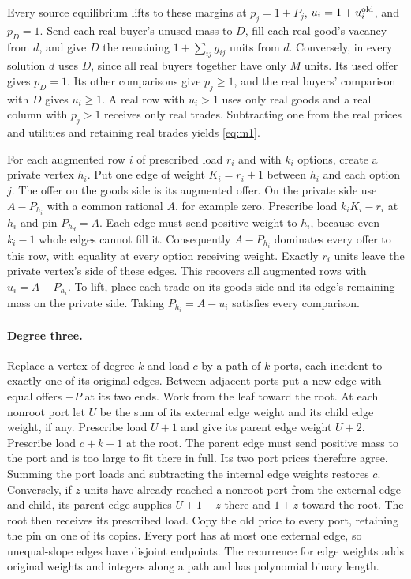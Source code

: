 \documentclass[11pt,oneside,openany,notitlepage]{report}
\begin{document}
Every source equilibrium lifts to these margins at \(p_j=1+P_j\),
\(u_i=1+u_i^{\rm old}\), and \(p_D=1\). Send each real buyer's unused
mass to \(D\), fill each real good's vacancy from \(d\), and give \(D\)
the remaining \(1+\sum_{ij}g_{ij}\) units from \(d\). Conversely, in
every solution \(d\) uses \(D\), since all real buyers together have
only \(M\) units. Its used offer gives \(p_D=1\). Its other comparisons
give \(p_j\ge1\), and the real buyers' comparison with \(D\) gives
\(u_i\ge1\). A real row with \(u_i>1\) uses only real goods and a real
column with \(p_j>1\) receives only real trades. Subtracting one from the
real prices and utilities and retaining real trades yields \eqref{eq:m1}.

For each augmented row \(i\) of prescribed load \(r_i\) and with \(k_i\)
options, create a private vertex \(h_i\). Put one edge of weight
\(K_i=r_i+1\) between \(h_i\) and each option \(j\). The offer on the
goods side is its augmented offer. On the private side use \(A-P_{h_i}\)
with a common rational \(A\), for example zero. Prescribe load
\(k_iK_i-r_i\) at \(h_i\) and pin \(P_{h_d}=A\).
Each edge must send positive weight to \(h_i\), because even \(k_i-1\)
whole edges cannot fill it. Consequently \(A-P_{h_i}\) dominates every
offer to this row, with equality at every option receiving weight.
Exactly \(r_i\) units leave the private vertex's side of these edges.
This recovers all augmented rows with \(u_i=A-P_{h_i}\). To lift, place
each trade on its goods side and its edge's remaining mass on the private
side. Taking \(P_{h_i}=A-u_i\) satisfies every comparison.

\paragraph{Degree three.}
Replace a vertex of degree \(k\) and load \(c\) by a path of \(k\) ports,
each incident to exactly one of its original edges. Between adjacent ports
put a new edge with equal offers \(-P\) at its two ends. Work from the leaf
toward the root. At each nonroot port let \(U\) be the sum of its external
edge weight and its child edge weight, if any. Prescribe load \(U+1\) and
give its parent edge weight \(U+2\). Prescribe load \(c+k-1\) at the root.
The parent edge must send positive mass to the port and is too large to
fit there in full. Its two port prices therefore agree. Summing the port
loads and subtracting the internal edge weights restores \(c\).
Conversely, if \(z\) units have already reached a nonroot port from the
external edge and child, its parent edge supplies \(U+1-z\) there and
\(1+z\) toward the root. The root then receives its prescribed load.
Copy the old price to every port, retaining the pin on one of its copies.
Every port has at most one external edge, so unequal-slope edges have
disjoint endpoints. The recurrence for edge weights adds original weights
and integers along a path and has polynomial binary length.
\end{document}
